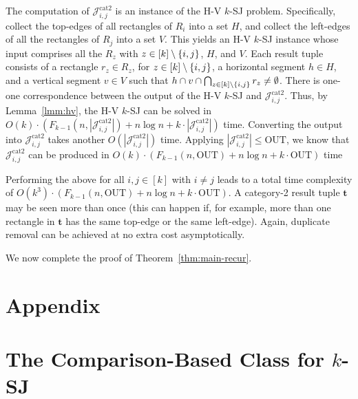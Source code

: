 \documentclass[sigconf]{acmart}
\def\vgap{\vspace{0mm}}
\def\extraspacing{\vspace{1.5mm} \noindent}
\def\J{\mathcal{J}}
\def\catt{\mathrm{cat2}}
\def\out{\mathrm{OUT}}
\begin{document}
{{{The computation of $\J^\catt_{i,j}$ is an instance of the H-V $k$-SJ problem. Specifically, collect the top-edges of all rectangles of $R_i$ into a set $H$, and collect the left-edges of all the rectangles of $R_j$ into a set $V$. This yields an H-V $k$-SJ instance whose input comprises all the $R_z$ with $z \in [k] \setminus \{i,j\}$,  $H$, and $V$. Each result tuple consists of a rectangle $r_z \in R_z$, for $z \in [k] \setminus \{i,j\}$, a horizontal segment $h \in H$, and a vertical segment $v \in V$ such that $h \cap v \cap \bigcap_{z \in [k] \setminus \{i,j\}} r_z \ne \emptyset$. There is one-one correspondence between the output of the H-V $k$-SJ and $\J^\catt_{i,j}$. Thus, by Lemma~\ref{lmm:hv}, the H-V $k$-SJ can be solved in $O(k) \cdot (F_{k-1}(n, |\J^\catt_{i,j}|) + n \log n + k \cdot |\J^\catt_{i,j}|)$ time. Converting the output into $\J^\catt_{i,j}$ takes another $O(|\J^\catt_{i,j}|)$ time. Applying $|\J^\catt_{i,j}| \le \out$, we know that $\J^\catt_{i,j}$ can be produced in $O(k) \cdot (F_{k-1}(n, \out) + n \log n + k \cdot \out)$ time

\vgap 

Performing the above for all $i, j \in [k]$ with $i \ne j$ leads to a total time complexity of $O(k^3) \cdot (F_{k-1}(n, \out) + n \log n + k \cdot \out)$. A category-2 result tuple $\bm{t}$ may be seen more than once (this can happen if, for example, more than one rectangle in $\bm{t}$ has the same top-edge or the same left-edge). Again, duplicate removal can be achieved at no extra cost asymptotically.

\vgap 

We now complete the proof of Theorem~\ref{thm:main-recur}.




\balance

\appendix 

\def\vgap{\vspace{2mm}}
\def\extraspacing{\vspace{2mm}}

\section*{Appendix}

\section{The Comparison-Based Class for $k$-SJ} \label{app:comp-class}

}}}
\end{document}
